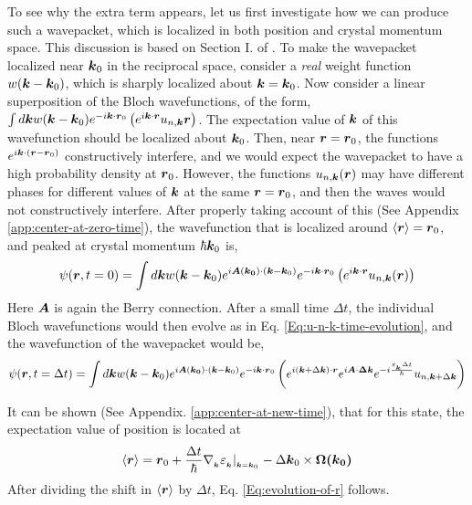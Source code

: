\documentclass{revtex4-2}
\renewcommand\vec[1]{\ensuremath\boldsymbol{#1}} %
\begin{document}
To see why the extra term appears, let us first investigate how we can produce such a wavepacket, which is localized in both position and crystal momentum space. This discussion is based on Section I. of \cite{ralph2020berry}. To make the wavepacket localized near $\vec{k}_0$ in the reciprocal space, consider a \textit{real} weight function $w(\vec{k} - \vec{k}_0)$, which is sharply localized about $\vec{k} = \vec{k}_0$. Now consider a linear superposition of the Bloch wavefunctions, of the form, $\int d\vec{k} w(\vec{k} - \vec{k}_0) e^{-i \vec{k} \cdot \vec{r}_0 } \left(e^{i \vec{k} \cdot\vec{r}} u_{n,\vec{k}}\vec{r}\right)$. The expectation value of $\vec{k}$ of this wavefunction should be localized about $\vec{k}_0$. Then, near $\vec{r} = \vec{r}_0$, the functions $e^{i \vec{k} \cdot (\vec{r} -\vec{r}_0 )}$ constructively interfere, and we would expect the wavepacket to have a high probability density at $\vec{r}_0$. However, the functions $u_{n,\vec{k}}(\vec{r})$ may have different phases for different values of $\vec{k}$ at the same $\vec{r} = \vec{r}_0$, and then the waves would not constructively interfere.
After properly taking account of this (See Appendix \ref{app:center-at-zero-time}), the wavefunction that is localized around $\expval{\vec{r}} = \vec{r}_0$, and peaked at crystal momentum $\hbar \vec{k}_0$ is,
$$\psi(\vec{r}, t=0) = \int d\vec{k} w(\vec{k} - \vec{k}_0) e^{i \vec{A}(\vec{k_0})\cdot (\vec{k} - \vec{k}_0)} e^{-i \vec{k} \cdot \vec{r}_0 } \left(e^{i \vec{k} \cdot\vec{r}} u_{n,\vec{k}}(\vec{r})\right)$$
Here $\vec{A}$ is again the Berry connection. After a small time $\Delta t$, the individual Bloch wavefunctions would then evolve as in Eq. \eqref{Eq:u-n-k-time-evolution}, and the wavefunction of the wavepacket would be,
$$\psi(\vec{r}, t=\Delta t) = \int d\vec{k} w(\vec{k} - \vec{k}_0) e^{i \vec{A}(\vec{k_0})\cdot (\vec{k} - \vec{k}_0)} e^{-i \vec{k} \cdot \vec{r}_0 } \left(e^{i (\vec{k} + \Delta\vec{k})\cdot\vec{r}} e^{i \vec{A}\cdot \vec{\Delta{k}}} e^{-i \frac{\varepsilon_{_{\vec{k}}} \Delta t}{\hbar}} u_{n, \vec{k}+\Delta \vec{k}} \right)$$

It can be shown (See Appendix. \ref{app:center-at-new-time}), that for this state, the expectation value of position is located at
$$\langle \vec{r} \rangle = \vec{r}_0 +  \frac{\Delta t}{\hbar} \nabla{_{_{\vec{k}}}} \varepsilon_{_{\vec{k}}}|_{_{\vec{k} = \vec{k}_0}} - \Delta \vec{k}_0 \times \vec{\Omega(\vec{k}_0)}$$
After dividing the shift in $\langle{\vec{r}}\rangle$ by $\Delta t$, Eq. \eqref{Eq:evolution-of-r} follows.
\end{document}

